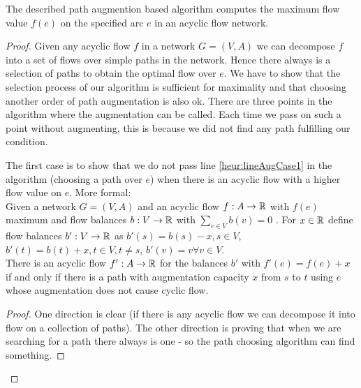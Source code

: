\begin{prop}
 The described path augmention based algorithm computes the maximum flow value $f(e)$ on the specified arc $e$ in an 
acyclic flow network.
\end{prop}
\begin{proof}
  
 Given any acyclic flow $f$ in a network $G=(V,A)$ we can decompose $f$ into a set of flows over simple paths in the 
 network. Hence there always is a selection of paths to obtain the optimal flow over $e$. 
 We have to show that the selection process of our algorithm is sufficient for maximality and that choosing another 
 order of path augmentation is also ok. 
 There are three points in  the algorithm where the augmentation can be called. Each time we pass on such a point 
 without augmenting, this is because we did not find any path fulfilling our condition.
 
 
 The first case is to show that we do not pass line \ref{heur:lineAugCase1} in the algorithm (choosing a path 
over $e$) when there is an acyclic flow with a higher flow value on $e$. 
More formal:\\

 Given a network $G=(V,A)$ and an acyclic flow $f:A\to \mathbb{R}$ with $f(e)$ maximum and flow balances $b:V\to \mathbb{R}$ with $ 
\sum_{v\in V}b(v)=0$ . For $x\in \mathbb{R}$ define flow balances $b':V\to \mathbb{R}$ as $b'(s)=b(s)-x, s\in V$,
$ b'(t)=b(t)+x,t\in V, t\neq s$, $ b'(v)=v\forall v\in V$.\\
There is an acyclic flow $f':A\to\mathbb{R}$ for the balances $b'$ with $f'(e)=f(e)+x$ if and only if there is a 
path with augmentation capacity $x$ from $s$ to $t$ using $e$ whose augmentation does not cause cyclic flow.\\

\begin{proof}
 One direction is clear (if there is any acyclic flow we can decompose it into flow on a collection of paths). The 
other direction is proving that when we are searching for a path there always is one - so the path choosing algorithm 
can find something.


\end{proof}
\end{proof}
